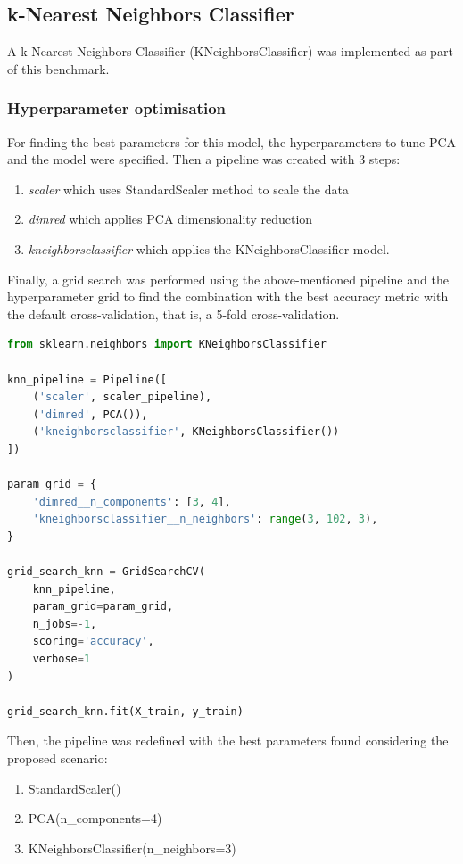 \documentclass{article}
\begin{document}
\subsection{k-Nearest Neighbors Classifier}
A k-Nearest Neighbors Classifier (KNeighborsClassifier) was implemented as part of this benchmark.

\subsubsection{Hyperparameter optimisation}
For finding the best parameters for this model, the hyperparameters to tune PCA and the model were specified. Then a pipeline was created with 3 steps:
\begin{enumerate}
\item \emph{scaler} which uses StandardScaler method to scale the data
\item \emph{dimred} which applies PCA dimensionality reduction
\item \emph{kneighborsclassifier} which applies the KNeighborsClassifier model.
\end{enumerate}

Finally, a grid search was performed using the above-mentioned pipeline and the hyperparameter grid to find the combination with the best accuracy metric with the default cross-validation, that is, a 5-fold cross-validation.
\begin{lstlisting}[language=Python]
from sklearn.neighbors import KNeighborsClassifier

knn_pipeline = Pipeline([
    ('scaler', scaler_pipeline), 
    ('dimred', PCA()), 
    ('kneighborsclassifier', KNeighborsClassifier())
])

param_grid = {
    'dimred__n_components': [3, 4], 
    'kneighborsclassifier__n_neighbors': range(3, 102, 3),
}

grid_search_knn = GridSearchCV(
    knn_pipeline,
    param_grid=param_grid,
    n_jobs=-1,
    scoring='accuracy',
    verbose=1
)

grid_search_knn.fit(X_train, y_train)
\end{lstlisting}

Then, the pipeline was redefined with the best parameters found considering the proposed scenario:
\begin{enumerate}
    \item StandardScaler()
    \item PCA(n\_components=4)
    \item KNeighborsClassifier(n\_neighbors=3)
\end{enumerate}
\end{document}
